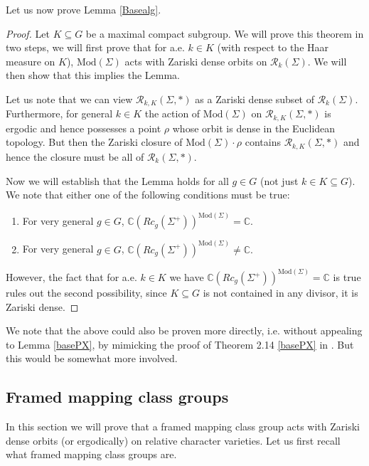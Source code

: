 \documentclass{article}
\newcommand{\Rc}{\mathcal{R}}
\newcommand{\CC}{\mathbb{C}}
\newcommand{\Mod}{\textrm{Mod}}
\begin{document}
Let us now prove Lemma \ref{Basealg}.
\begin{proof}
    Let $K \subseteq G$ be a maximal compact subgroup.
    We will prove this theorem in two steps, we will first prove that for a.e. $k \in K$ (with respect to the Haar measure on $K$), $\Mod(\Sigma)$ acts with Zariski dense orbits on $\Rc_k(\Sigma).$ We will then show that this implies the Lemma.

    Let us note that we can view $\Rc_{k,K}(\Sigma, *)$ as a Zariski dense subset of $\Rc_k(\Sigma).$ Furthermore, for general $k \in K$ the action of $\Mod(\Sigma)$ on $\Rc_{k,K}(\Sigma, *)$ is ergodic and hence possesses a point $\rho$ whose orbit is dense in the Euclidean topology. But then the Zariski closure of $\Mod(\Sigma) \cdot \rho$ contains $\Rc_{k,K}(\Sigma, *)$ and hence the closure must be all of $\Rc_k(\Sigma, *).$

    Now we will establish that the Lemma holds for all $g \in G$ (not just $k \in K \subseteq G$). We note that either one of the following conditions must be true:
    \begin{enumerate}
        \item For very general $g \in G$, $\CC (Rc_g(\Sigma^+))^{\Mod(\Sigma)} = \CC.$
        \item  For very general $g \in G$, $\CC (Rc_g(\Sigma^+))^{\Mod(\Sigma)} \neq \CC.$
    \end{enumerate}
    However, the fact that for a.e. $k \in K$ we have $\CC (Rc_g(\Sigma^+))^{\Mod(\Sigma)} = \CC$ is true rules out the second possibility, since $K \subseteq G$ is not contained in any divisor, it is Zariski dense.
\end{proof}

We note that the above could also be proven more directly, i.e. without appealing to Lemma \ref{basePX}, by mimicking the proof of Theorem 2.14 \ref{basePX} in \cite{PX}. But this would be somewhat more involved. 
\subsection{Framed mapping class groups}

In this section we will prove that a framed mapping class group acts with Zariski dense orbits (or ergodically) on relative character varieties. Let us first recall what framed mapping class groups are.
\end{document}
